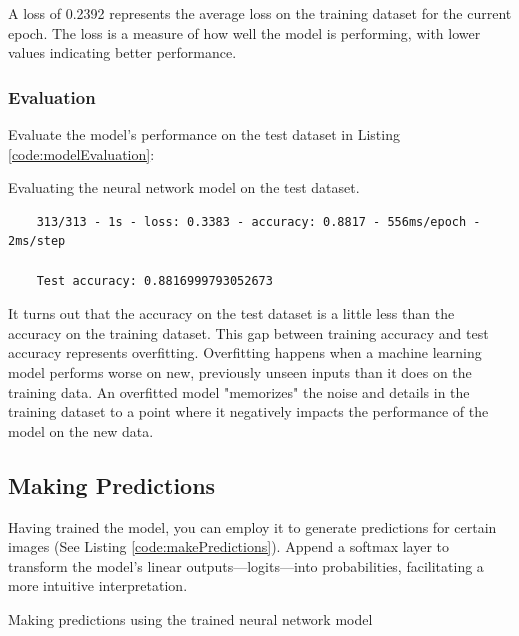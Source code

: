 A loss of 0.2392 represents the average loss on the training dataset for the current epoch. The loss is a measure of how well the model is performing, with lower values indicating better performance.


\subsubsection{Evaluation}

Evaluate the model's performance on the test dataset in Listing \ref{code:modelEvaluation}:

\begin{code}[h!]
	    
	
	\caption{Evaluating the neural network model on the test dataset.}
	\label{code:modelEvaluation}
\end{code}

\begin{verbatim}
	313/313 - 1s - loss: 0.3383 - accuracy: 0.8817 - 556ms/epoch - 2ms/step
	
	Test accuracy: 0.8816999793052673
\end{verbatim}

It turns out that the accuracy on the test dataset is a little less than the accuracy on the training dataset. This gap between training accuracy and test accuracy represents overfitting. Overfitting happens when a machine learning model performs worse on new, previously unseen inputs than it does on the training data. An overfitted model "memorizes" the noise and details in the training dataset to a point where it negatively impacts the performance of the model on the new data.

\subsection{Making Predictions}

Having trained the model, you can employ it to generate predictions for certain images (See Listing \ref{code:makePredictions}). Append a softmax layer to transform the model's linear outputs—logits—into probabilities, facilitating a more intuitive interpretation.

\begin{code}[h!]
	    
	
	\caption{Making predictions using the trained neural network model}
	\label{code:makePredictions}
\end{code}

